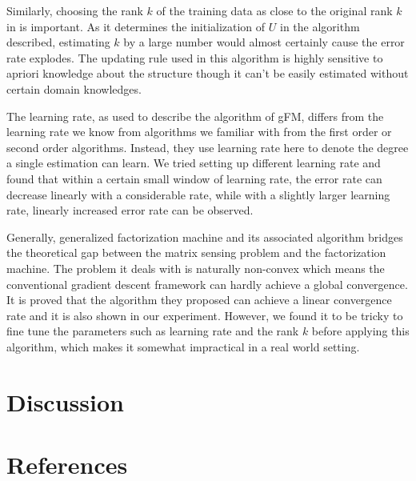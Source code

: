 \documentclass{article}
\begin{document}
Similarly, choosing the rank $k$ of the training data as close to the original rank $k$ in is important. As it determines the initialization of $U$ in the algorithm described, estimating $k$ by a large number would almost certainly cause the error rate explodes. The updating rule used in this algorithm is highly sensitive to apriori knowledge about the structure though it can't be easily estimated without certain domain knowledges.

The learning rate, as used to describe the algorithm of gFM, differs from the learning rate we know from algorithms we familiar with from the first order or second order algorithms. Instead, they use learning rate here to denote the degree a single estimation can learn. We tried setting up different learning rate and found that within a certain small window of learning rate, the error rate can decrease linearly with a considerable rate, while with a slightly larger learning rate, linearly increased error rate can be observed.

Generally, generalized factorization machine and its associated algorithm bridges the theoretical gap between the matrix sensing problem and the factorization machine. The problem it deals with is naturally non-convex which means the conventional gradient descent framework can hardly achieve a global convergence. It is proved that the algorithm they proposed can achieve a linear convergence rate and it is also shown in our experiment. However, we found it to be tricky to fine tune the parameters such as learning rate and the rank $k$ before applying this algorithm, which makes it somewhat impractical in a real world setting.


\section{Discussion}

\section*{References}
\small{
\renewcommand{\section}[2]{}%
 

}
\end{document}
